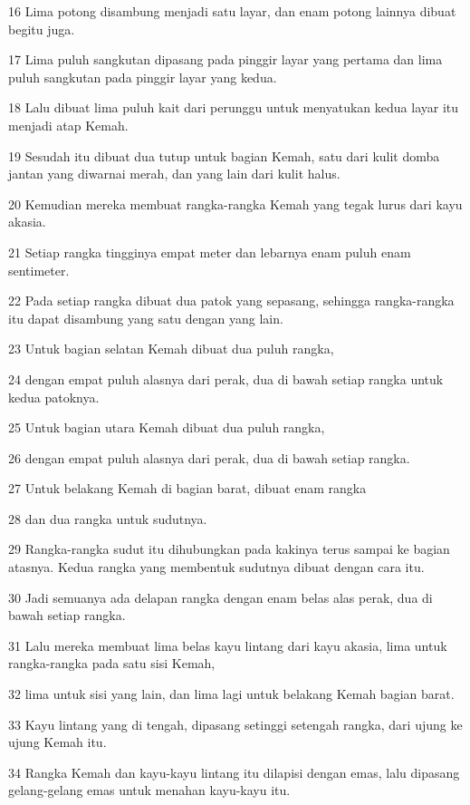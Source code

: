 \par 16 Lima potong disambung menjadi satu layar, dan enam potong lainnya dibuat begitu juga.
\par 17 Lima puluh sangkutan dipasang pada pinggir layar yang pertama dan lima puluh sangkutan pada pinggir layar yang kedua.
\par 18 Lalu dibuat lima puluh kait dari perunggu untuk menyatukan kedua layar itu menjadi atap Kemah.
\par 19 Sesudah itu dibuat dua tutup untuk bagian Kemah, satu dari kulit domba jantan yang diwarnai merah, dan yang lain dari kulit halus.
\par 20 Kemudian mereka membuat rangka-rangka Kemah yang tegak lurus dari kayu akasia.
\par 21 Setiap rangka tingginya empat meter dan lebarnya enam puluh enam sentimeter.
\par 22 Pada setiap rangka dibuat dua patok yang sepasang, sehingga rangka-rangka itu dapat disambung yang satu dengan yang lain.
\par 23 Untuk bagian selatan Kemah dibuat dua puluh rangka,
\par 24 dengan empat puluh alasnya dari perak, dua di bawah setiap rangka untuk kedua patoknya.
\par 25 Untuk bagian utara Kemah dibuat dua puluh rangka,
\par 26 dengan empat puluh alasnya dari perak, dua di bawah setiap rangka.
\par 27 Untuk belakang Kemah di bagian barat, dibuat enam rangka
\par 28 dan dua rangka untuk sudutnya.
\par 29 Rangka-rangka sudut itu dihubungkan pada kakinya terus sampai ke bagian atasnya. Kedua rangka yang membentuk sudutnya dibuat dengan cara itu.
\par 30 Jadi semuanya ada delapan rangka dengan enam belas alas perak, dua di bawah setiap rangka.
\par 31 Lalu mereka membuat lima belas kayu lintang dari kayu akasia, lima untuk rangka-rangka pada satu sisi Kemah,
\par 32 lima untuk sisi yang lain, dan lima lagi untuk belakang Kemah bagian barat.
\par 33 Kayu lintang yang di tengah, dipasang setinggi setengah rangka, dari ujung ke ujung Kemah itu.
\par 34 Rangka Kemah dan kayu-kayu lintang itu dilapisi dengan emas, lalu dipasang gelang-gelang emas untuk menahan kayu-kayu itu.
